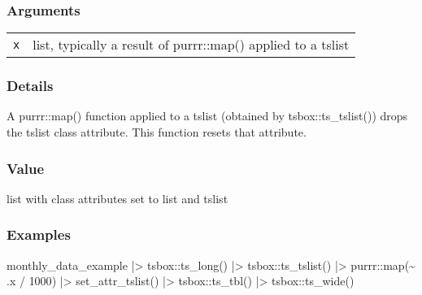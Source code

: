 \documentclass[
  letterpaper,
  DIV=11,
  numbers=noendperiod]{scrreport}
\newenvironment{Shaded}{\begin{snugshade}}{\end{snugshade}}
\newcommand{\DecValTok}[1]{\textcolor[rgb]{0.68,0.00,0.00}{#1}}
\newcommand{\FunctionTok}[1]{\textcolor[rgb]{0.28,0.35,0.67}{#1}}
\newcommand{\NormalTok}[1]{\textcolor[rgb]{0.00,0.23,0.31}{#1}}
\newcommand{\SpecialCharTok}[1]{\textcolor[rgb]{0.37,0.37,0.37}{#1}}
\begin{document}
\subsubsection{Arguments}\label{arguments-54}

\begin{longtable}[]{@{}ll@{}}
\toprule\noalign{}
\endhead
\bottomrule\noalign{}
\endlastfoot
\texttt{x} & list, typically a result of purrr::map() applied to a
tslist \\
\end{longtable}

\subsubsection{Details}\label{details-16}

A purrr::map() function applied to a tslist (obtained by
tsbox::ts\_tslist()) drops the tslist class attribute. This function
resets that attribute.

\subsubsection{Value}\label{value-54}

list with class attributes set to list and tslist

\subsubsection{Examples}\label{examples-54}

\begin{Shaded}
\begin{Highlighting}[]
\NormalTok{monthly\_data\_example }\SpecialCharTok{|\textgreater{}}
\NormalTok{  tsbox}\SpecialCharTok{::}\FunctionTok{ts\_long}\NormalTok{() }\SpecialCharTok{|\textgreater{}}
\NormalTok{  tsbox}\SpecialCharTok{::}\FunctionTok{ts\_tslist}\NormalTok{() }\SpecialCharTok{|\textgreater{}}
\NormalTok{  purrr}\SpecialCharTok{::}\FunctionTok{map}\NormalTok{(}\SpecialCharTok{\textasciitilde{}}\NormalTok{ .x }\SpecialCharTok{/} \DecValTok{1000}\NormalTok{) }\SpecialCharTok{|\textgreater{}}
  \FunctionTok{set\_attr\_tslist}\NormalTok{() }\SpecialCharTok{|\textgreater{}}
\NormalTok{  tsbox}\SpecialCharTok{::}\FunctionTok{ts\_tbl}\NormalTok{() }\SpecialCharTok{|\textgreater{}}
\NormalTok{  tsbox}\SpecialCharTok{::}\FunctionTok{ts\_wide}\NormalTok{()}
\end{Highlighting}
\end{Shaded}
\end{document}
